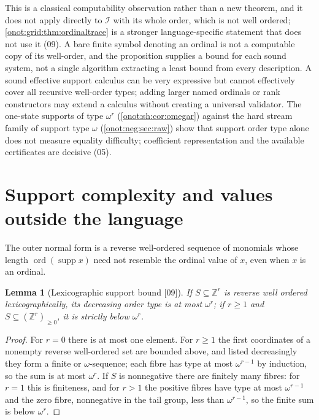 \documentclass[11pt,oneside]{article}
\numberwithin{equation}{section}
\newtheorem{lemma}[lemma]{Lemma}
\theoremstyle{definition}
\theoremstyle{remark}
\newcommand{\Z}{\mathbb Z}
\newcommand{\IO}{\mathcal I}
\newcommand{\supp}{\operatorname{supp}}
\newcommand{\ord}{\operatorname{ord}}
\newcommand{\src}[1]{\textup{\textsf{\small[#1]}}}
\begin{document}
This is a classical computability observation rather than a new theorem, and it
does not apply directly to $\IO$ with its whole order, which is not well ordered;
\cref{onot:grid:thm:ordinaltrace} is a stronger language-specific statement that
does not use it (09). A bare finite symbol denoting an ordinal is not a computable
copy of its well-order, and the proposition supplies a bound for each sound
system, not a single algorithm extracting a least bound from every description.
A sound effective support calculus can be very expressive but cannot effectively
cover all recursive well-order types; adding larger named ordinals or rank
constructors may extend a calculus without creating a universal validator. The
one-state supports of type $\omega^r$ (\cref{onot:sh:cor:omegar}) against the hard
stream family of support type $\omega$ (\cref{onot:neg:sec:raw}) show that support
order type alone does not measure equality difficulty; coefficient representation
and the available certificates are decisive (05).

\section{Support complexity and values outside the language}\label{onot:grid:sec:support}

The outer normal form is a reverse well-ordered sequence of monomials whose length
$\ord(\supp x)$ need not resemble the ordinal value of $x$, even when $x$ is an
ordinal.

\begin{lemma}[Lexicographic support bound \src{09}]\label{onot:grid:lem:lexbound}
If $S\subseteq\Z^r$ is reverse well ordered lexicographically, its decreasing
order type is at most $\omega^r$; if $r\ge1$ and $S\subseteq(\Z^r)_{\ge0}$, it is
strictly below $\omega^r$.
\end{lemma}
\begin{proof}
For $r=0$ there is at most one element. For $r\ge1$ the first coordinates of a
nonempty reverse well-ordered set are bounded above, and listed decreasingly they
form a finite or $\omega$-sequence; each fibre has type at most $\omega^{r-1}$ by
induction, so the sum is at most $\omega^r$. If $S$ is nonnegative there are
finitely many fibres: for $r=1$ this is finiteness, and for $r>1$ the positive
fibres have type at most $\omega^{r-1}$ and the zero fibre, nonnegative in the
tail group, less than $\omega^{r-1}$, so the finite sum is below $\omega^r$.
\end{proof}
\end{document}
